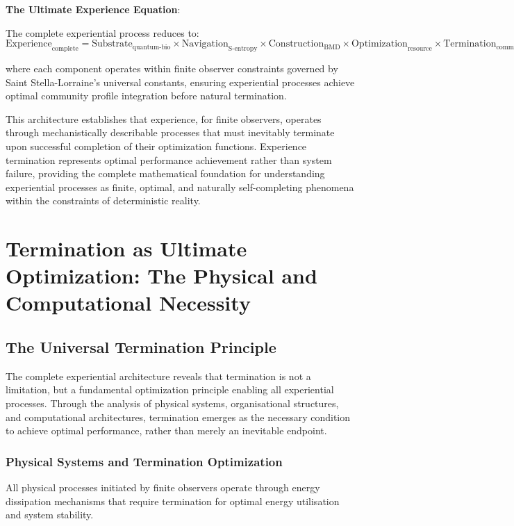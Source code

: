 \documentclass{article}
\begin{document}
\textbf{The Ultimate Experience Equation}:

The complete experiential process reduces to:
\begin{equation}
\text{Experience}_{\text{complete}} = \text{Substrate}_{\text{quantum-bio}} \times \text{Navigation}_{\text{S-entropy}} \times \text{Construction}_{\text{BMD}} \times \text{Optimization}_{\text{resource}} \times \text{Termination}_{\text{community}}
\end{equation}

where each component operates within finite observer constraints governed by Saint Stella-Lorraine's universal constants, ensuring experiential processes achieve optimal community profile integration before natural termination.

This architecture establishes that experience, for finite observers, operates through mechanistically describable processes that must inevitably terminate upon successful completion of their optimization functions. Experience termination represents optimal performance achievement rather than system failure, providing the complete mathematical foundation for understanding experiential processes as finite, optimal, and naturally self-completing phenomena within the constraints of deterministic reality.

\section{Termination as Ultimate Optimization: The Physical and Computational Necessity}

\subsection{The Universal Termination Principle}

The complete experiential architecture reveals that termination is not a limitation, but a fundamental optimization principle enabling all experiential processes. Through the analysis of physical systems, organisational structures, and computational architectures, termination emerges as the necessary condition to achieve optimal performance, rather than merely an inevitable endpoint.

\subsubsection{Physical Systems and Termination Optimization}

All physical processes initiated by finite observers operate through energy dissipation mechanisms that require termination for optimal energy utilisation and system stability.
\end{document}
